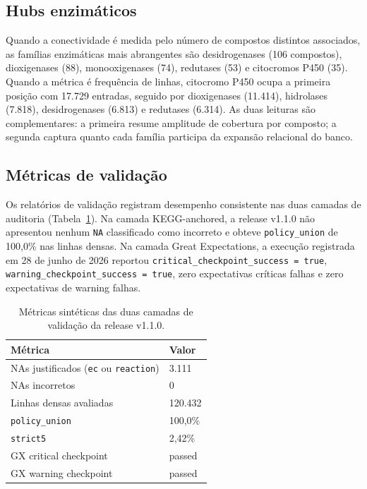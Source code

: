 \subsection{Hubs enzimáticos}

Quando a conectividade é medida pelo número de compostos distintos associados, as famílias enzimáticas mais abrangentes são desidrogenases (106 compostos), dioxigenases (88), monooxigenases (74), redutases (53) e citocromos P450 (35). Quando a métrica é frequência de linhas, citocromo P450 ocupa a primeira posição com 17.729 entradas, seguido por dioxigenases (11.414), hidrolases (7.818), desidrogenases (6.813) e redutases (6.314). As duas leituras são complementares: a primeira resume amplitude de cobertura por composto; a segunda captura quanto cada família participa da expansão relacional do banco.

\subsection{Métricas de validação}

Os relatórios de validação registram desempenho consistente nas duas camadas de auditoria (Tabela~\ref{tab:c1-validation-metrics}). Na camada KEGG-anchored, a release v1.1.0 não apresentou nenhum \texttt{NA} classificado como incorreto e obteve \texttt{policy\_union} de 100,0\% nas linhas densas. Na camada Great Expectations, a execução registrada em 28 de junho de 2026 reportou \texttt{critical\_checkpoint\_success = true}, \texttt{warning\_checkpoint\_success = true}, zero expectativas críticas falhas e zero expectativas de warning falhas.

\begin{table}[htbp]
\centering
\caption{Métricas sintéticas das duas camadas de validação da release v1.1.0.}
\label{tab:c1-validation-metrics}
\small
\begin{tabular}{@{}ll@{}}
\toprule
\textbf{Métrica} & \textbf{Valor} \\
\midrule
NAs justificados (\texttt{ec} ou \texttt{reaction}) & 3.111 \\
NAs incorretos & 0 \\
Linhas densas avaliadas & 120.432 \\
\texttt{policy\_union} & 100,0\% \\
\texttt{strict5} & 2,42\% \\
GX critical checkpoint & passed \\
GX warning checkpoint & passed \\
\bottomrule
\end{tabular}
\end{table}

